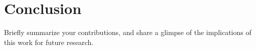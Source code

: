 \section{Conclusion}\label{s:conclusion}

Briefly summarize your contributions, and share a glimpse of the implications of
this work for future research.


